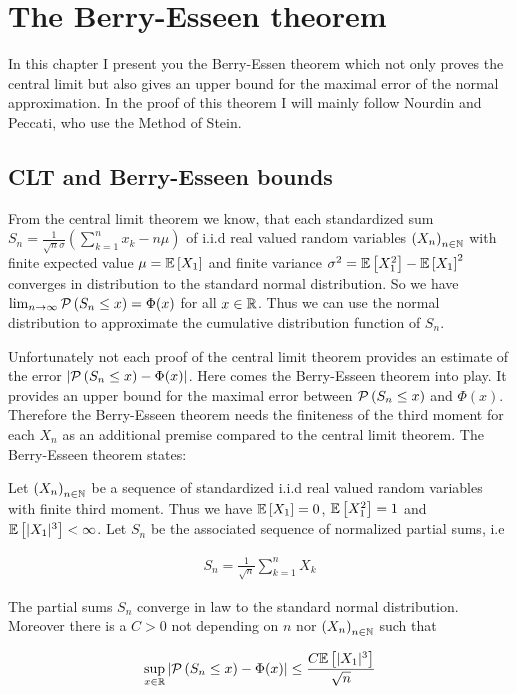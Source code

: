 \chapter{The Berry-Esseen theorem}

In this chapter I present you the Berry-Essen theorem which not only proves the central limit but also gives an upper bound for the maximal error of the normal approximation. In the proof of this theorem I will mainly follow Nourdin and Peccati\cite[p. 71 ff.]{nourdin}, who use the Method of Stein.

\section{CLT and Berry-Esseen bounds}

From the central limit theorem we know, that each standardized sum $S_n = \tfrac 1{\sqrt n\sigma} \left(\sum_{k=1}^n x_k - n\mu\right)$ of i.i.d real valued random variables $\seq{X_n}$ with finite expected value $\mu=\E{X_1}$ and finite variance $\sigma^2=\E{X_1^2}-\E{X_1}^2$ converges in distribution to the standard normal distribution. So we have $\lim_{n\to\infty} \P{S_n\le x} = \Phi(x)$ for all $x\in\R$. Thus we can use the normal distribution to approximate the cumulative distribution function of $S_n$.

Unfortunately not each proof of the central limit theorem provides an estimate of the error $\abs{\P{S_n\le x}-\Phi(x)}$. Here comes the Berry-Esseen theorem into play. It provides an upper bound for the maximal error between $\P{S_n \le x}$ and $\Phi(x)$. Therefore the Berry-Esseen theorem needs the finiteness of the third moment for each $X_n$ as an additional premise compared to the central limit theorem. The Berry-Esseen theorem states\cite[p. 71]{nourdin}:

\begin{theorem}
  Let $\seq{X_n}$ be a sequence of standardized i.i.d real valued random variables with finite third moment. Thus we have $\E{X_1}=0$, $\E{X_1^2}=1$ and $\E{|X_1|^3} < \infty$. Let $S_n$ be the associated sequence of normalized partial sums, i.e

  \begin{align}
    S_n = \frac{1}{\sqrt n} \sum_{k=1}^n X_k
  \end{align}

  The partial sums $S_n$ converge in law to the standard normal distribution. Moreover there is a $C > 0$ not depending on $n$ nor $\seq{X_n}$ such that

  \begin{align}
    \sup_{x\in\R} \abs{\P{S_n\le x}-\Phi(x)} \le \frac{C \E{|X_1|^3}}{\sqrt n}
  \end{align}
\end{theorem}

